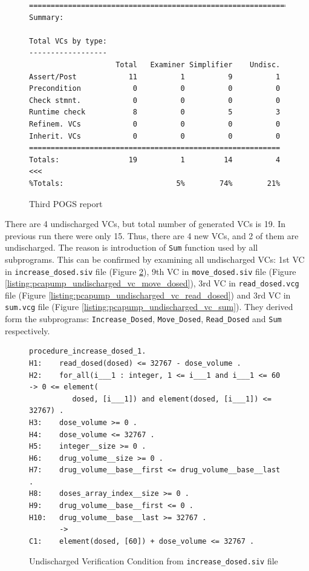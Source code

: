 \begin{figure}
\begin{lstlisting}[frame=single, gobble=0]
===============================================================================
Summary:

Total VCs by type:
------------------
                    Total   Examiner Simplifier    Undisc.
Assert/Post            11          1          9          1
Precondition            0          0          0          0
Check stmnt.            0          0          0          0
Runtime check           8          0          5          3
Refinem. VCs            0          0          0          0
Inherit. VCs            0          0          0          0
==========================================================
Totals:                19          1         14          4 <<<
%Totals:                          5%        74%        21%
\end{lstlisting}
\doublespacing
\caption{Third POGS report}
\label{listing:pcapump_dosemonitor_pogs3}
\end{figure}

There are 4 undischarged VCs, but total number of generated VCs is 19. In previous run there were only 15. Thus, there are 4 new VCs, and 2 of them are undischarged. The reason is introduction of \lstinline{Sum} function used by all subprograms. This can be confirmed by examining all undischarged VCs: 1st VC in \lstinline{increase_dosed.siv} file (Figure \ref{listing:pcapump_undischarged_vc_increase_dosed}), 9th VC in \lstinline{move_dosed.siv} file (Figure \ref{listing:pcapump_undischarged_vc_move_dosed}), 3rd VC in \lstinline{read_dosed.vcg} file (Figure \ref{listing:pcapump_undischarged_vc_read_dosed}) and 3rd VC in \lstinline{sum.vcg} file (Figure \ref{listing:pcapump_undischarged_vc_sum}). They derived form the subprograms: \lstinline{Increase_Dosed}, \lstinline{Move_Dosed}, \lstinline{Read_Dosed} and \lstinline{Sum} respectively.

\begin{figure}[h]
\singlespacing
\begin{lstlisting}[frame=single, gobble=0]
procedure_increase_dosed_1.
H1:    read_dosed(dosed) <= 32767 - dose_volume .
H2:    for_all(i___1 : integer, 1 <= i___1 and i___1 <= 60 -> 0 <= element(
          dosed, [i___1]) and element(dosed, [i___1]) <= 32767) .
H3:    dose_volume >= 0 .
H4:    dose_volume <= 32767 .
H5:    integer__size >= 0 .
H6:    drug_volume__size >= 0 .
H7:    drug_volume__base__first <= drug_volume__base__last .
H8:    doses_array_index__size >= 0 .
H9:    drug_volume__base__first <= 0 .
H10:   drug_volume__base__last >= 32767 .
       ->
C1:    element(dosed, [60]) + dose_volume <= 32767 .
\end{lstlisting}
\doublespacing
\caption{Undischarged Verification Condition from \lstinline{increase_dosed.siv} file}
\label{listing:pcapump_undischarged_vc_increase_dosed}
\end{figure}

